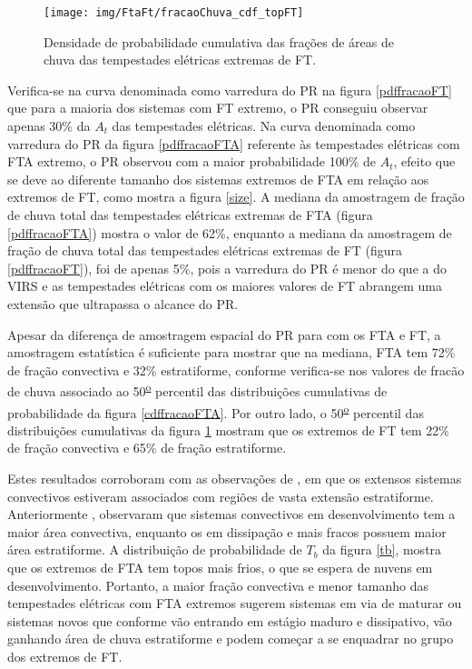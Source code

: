 \begin{figure}[!ht]
  \centering 
  \texttt{[image: img/FtaFt/fracaoChuva\_cdf\_topFT]}
  \caption{Densidade de probabilidade cumulativa das frações de áreas de chuva das tempestades elétricas extremas de FT.}
  \label{cdffracaoFT}
\end{figure}


Verifica-se na curva denominada como varredura do PR na figura \ref{pdffracaoFT} que para a maioria dos sistemas com FT extremo, o PR conseguiu observar apenas 30\% da $A_t$ das tempestades elétricas. Na curva denominada como varredura do PR da figura \ref{pdffracaoFTA} referente às tempestades elétricas com FTA extremo, o PR observou com a maior probabilidade 100\% de $A_t$, efeito que se deve ao diferente tamanho dos sistemas extremos de FTA em relação aos extremos de FT, como mostra a figura \ref{size}. A mediana da amostragem de fração de chuva total das tempestades elétricas extremas de FTA (figura \ref{pdffracaoFTA}) mostra o valor de 62\%, enquanto a mediana da amostragem de fração de chuva total das tempestades elétricas extremas de FT (figura \ref{pdffracaoFT}), foi de apenas 5\%, pois a varredura do PR é menor do que a do VIRS e as tempestades elétricas com os maiores valores de FT abrangem uma extensão que ultrapassa o alcance do PR. 

Apesar da diferença de amostragem espacial do PR para com os FTA e FT, a amostragem estatística é suficiente para mostrar que na mediana, FTA tem 72\% de fração convectiva e 32\% estratiforme, conforme verifica-se nos valores de fracão de chuva associado ao 50\textsuperscript{\underline{o}} percentil das distribuições cumulativas de probabilidade da figura \ref{cdffracaoFTA}. Por outro lado, o 50\textsuperscript{\underline{o}} percentil das distribuições cumulativas da figura \ref{cdffracaoFT} mostram que os extremos de FT tem 22\% de fração convectiva e 65\% de fração estratiforme. 

Estes resultados corroboram com as observações de , em que os extensos sistemas convectivos estiveram associados com regiões de vasta extensão estratiforme. Anteriormente , observaram que sistemas convectivos em desenvolvimento tem a maior área convectiva, enquanto os em dissipação e mais fracos possuem maior área estratiforme. A distribuição de probabilidade de $T_b$ da figura \ref{tb}, mostra que os extremos de FTA tem topos mais frios, o que se espera de nuvens em desenvolvimento. Portanto, a maior fração convectiva e menor tamanho das tempestades elétricas com FTA extremos sugerem sistemas em via de maturar ou sistemas novos que conforme  vão entrando em estágio maduro e dissipativo, vão ganhando área de chuva estratiforme e podem começar a se enquadrar no grupo dos extremos de FT. 

